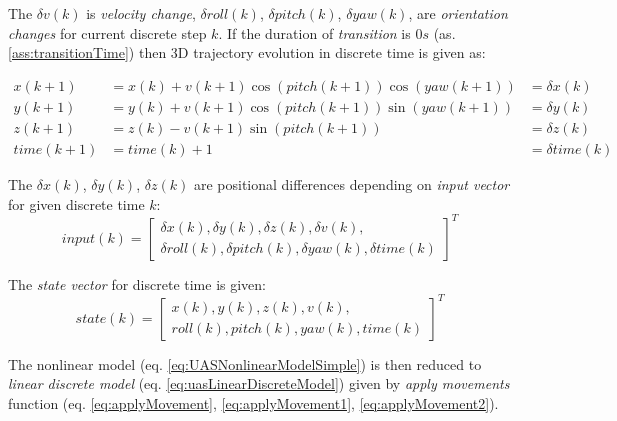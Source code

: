 The $\delta v(k)$ is \emph{velocity change}, $\delta roll(k)$, $\delta pitch(k)$, $\delta yaw(k)$, are \emph{orientation changes} for current discrete step $k$. If the duration of \emph{transition} is $0 s$ (as. \ref{ass:transitionTime}) then 3D trajectory evolution in discrete time is given as: 

\begin{equation}\label{eq:applyMovement2}
    \begin{aligned}
        x(k+1)&= x(k) + v(k+1) \cos(pitch(k+1)) \cos(yaw(k+1)) & = \delta x(k)\\
        y(k+1)&= y(k) + v(k+1) \cos(pitch(k+1)) \sin(yaw(k+1)) & = \delta y(k)\\
        z(k+1)&= z(k) - v(k+1) \sin(pitch(k+1))                & = \delta z(k)\\
        time(k+1)& = time(k)+1                                & = \delta time(k)
    \end{aligned}    
\end{equation}

The $\delta x(k)$, $\delta y(k)$, $\delta z(k)$ are positional differences depending on \emph{input vector} for given discrete time $k$:
\begin{equation}\label{eq:ourImput}
    input(k) = \left[
                    \begin{gathered}
                    \delta x(k), \delta y(k), \delta z(k), \delta v (k),\\
                    \delta roll (k), \delta pitch(k), \delta yaw(k),\delta time (k)
                    \end{gathered} 
                \right]^T
\end{equation}

The \emph{state vector} for discrete time is given:
\begin{equation}\label{eq:ourState}
    state(k) = \left[
                    \begin{gathered}
                     x(k),  y(k),  z(k),  v (k),\\
                     roll (k),  pitch(k),  yaw(k), time (k)
                    \end{gathered} 
                \right]^T
\end{equation}

The nonlinear model (eq. \ref{eq:UASNonlinearModelSimple}) is then reduced to \emph{linear discrete model} (eq. \ref{eq:uasLinearDiscreteModel}) given by \emph{apply movements} function (eq. \ref{eq:applyMovement}, \ref{eq:applyMovement1}, \ref{eq:applyMovement2}).

